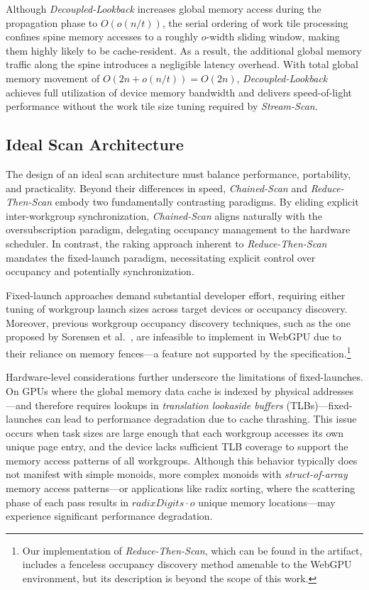 \documentclass[sigconf]{acmart}
\begin{document}
Although \emph{Decoupled-Lookback} increases global memory access during the propagation phase to $O(o(n/t))$, the serial ordering of work tile processing confines spine memory accesses to a roughly $o$-width sliding window, making them highly likely to be cache-resident. As a result, the additional global memory traffic along the spine introduces a negligible latency overhead. With total global memory movement of $O(2n+o(n/t))= O(2n)$, \emph{Decoupled-Lookback} achieves full utilization of device memory bandwidth and delivers speed-of-light performance without the work tile size tuning required by \emph{Stream-Scan}.

\subsection{Ideal Scan Architecture}
The design of an ideal scan architecture must balance performance, portability, and practicality. Beyond their differences in speed, \emph{Chained-Scan} and \emph{Reduce-Then-Scan} embody two fundamentally contrasting paradigms. By eliding explicit inter-workgroup synchronization, \emph{Chained-Scan} aligns naturally with the oversubscription paradigm, delegating occupancy management to the hardware scheduler. In contrast, the raking approach inherent to \emph{Reduce-Then-Scan} mandates the fixed-launch paradigm, necessitating explicit control over occupancy and potentially synchronization.

Fixed-launch approaches demand substantial developer effort, requiring either tuning of workgroup launch sizes across target devices or occupancy discovery. Moreover, previous workgroup occupancy discovery techniques, such as the one proposed by Sorensen et al.~\cite{sorensen2016}, are infeasible to implement in WebGPU due to their reliance on memory fences---a feature not supported by the specification.\footnote{Our implementation of \emph{Reduce-Then-Scan}, which can be found in the artifact, includes a fenceless occupancy discovery method amenable to the WebGPU environment, but its description is beyond the scope of this work.}

Hardware-level considerations further underscore the limitations of fixed-launches. On GPUs where the global memory data cache is indexed by physical addresses---and therefore requires lookups in \emph{translation lookaside buffers} (TLBs)---fixed-launches can lead to performance degradation due to cache thrashing. This issue occurs when task sizes are large enough that each workgroup accesses its own unique page entry, and the device lacks sufficient TLB coverage to support the memory access patterns of all workgroups. Although this behavior typically does not manifest with simple monoids, more complex monoids with \emph{struct-of-array} memory access patterns---or applications like radix sorting, where the scattering phase of each pass results in $radixDigits \cdot o$ unique memory locations---may experience significant performance degradation.
\end{document}
